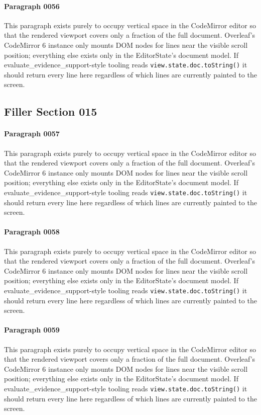 \documentclass{article}
\begin{document}
\paragraph{Paragraph 0056}
This paragraph exists purely to occupy vertical space in the CodeMirror editor so that the rendered viewport covers only a fraction of the full document. Overleaf's CodeMirror 6 instance only mounts DOM nodes for lines near the visible scroll position; everything else exists only in the EditorState's document model. If evaluate\_evidence\_support-style tooling reads \texttt{view.state.doc.toString()} it should return every line here regardless of which lines are currently painted to the screen.

\subsection{Filler Section 015}
\paragraph{Paragraph 0057}
This paragraph exists purely to occupy vertical space in the CodeMirror editor so that the rendered viewport covers only a fraction of the full document. Overleaf's CodeMirror 6 instance only mounts DOM nodes for lines near the visible scroll position; everything else exists only in the EditorState's document model. If evaluate\_evidence\_support-style tooling reads \texttt{view.state.doc.toString()} it should return every line here regardless of which lines are currently painted to the screen.

\paragraph{Paragraph 0058}
This paragraph exists purely to occupy vertical space in the CodeMirror editor so that the rendered viewport covers only a fraction of the full document. Overleaf's CodeMirror 6 instance only mounts DOM nodes for lines near the visible scroll position; everything else exists only in the EditorState's document model. If evaluate\_evidence\_support-style tooling reads \texttt{view.state.doc.toString()} it should return every line here regardless of which lines are currently painted to the screen.

\paragraph{Paragraph 0059}
This paragraph exists purely to occupy vertical space in the CodeMirror editor so that the rendered viewport covers only a fraction of the full document. Overleaf's CodeMirror 6 instance only mounts DOM nodes for lines near the visible scroll position; everything else exists only in the EditorState's document model. If evaluate\_evidence\_support-style tooling reads \texttt{view.state.doc.toString()} it should return every line here regardless of which lines are currently painted to the screen.
\end{document}

